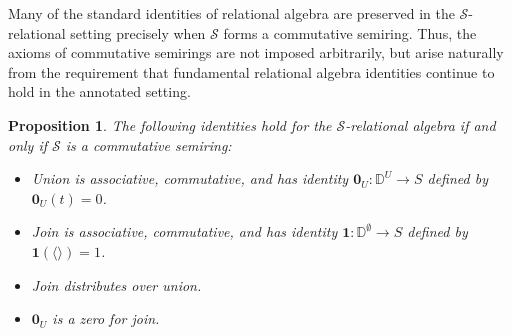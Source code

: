 \documentclass[oneside, 11pt]{amsbook}
\theoremstyle{plain}
\newtheorem{prop}[thm]{Proposition}
\theoremstyle{definition}
\theoremstyle{remark}
\begin{document}
Many of the standard identities of relational algebra are preserved in the $\mathcal{S}$-relational setting precisely when $\mathcal{S}$ forms a commutative semiring. Thus, the axioms of commutative semirings are not imposed arbitrarily, but arise naturally from the requirement that fundamental relational algebra identities continue to hold in the annotated setting.

\begin{prop}
    \label{prop:identitiesifcommsemiring}
    The following identities hold for the $\mathcal{S}$-relational algebra if and only if $\mathcal{S}$ is a commutative semiring:
    \begin{itemize}
        \item Union is associative, commutative, and has identity $\mathbf{0}_U : \mathbb{D}^U \to S$ defined by $\mathbf{0}_U(t) = 0$.
        \item Join is associative, commutative, and has identity $\mathbf{1} : \mathbb{D}^\emptyset \to S$ defined by $\mathbf{1}(\langle \rangle) = 1$.
        \item Join distributes over union.
        \item $\mathbf{0}_U$ is a zero for join.
    \end{itemize}
\end{prop}
\end{document}
